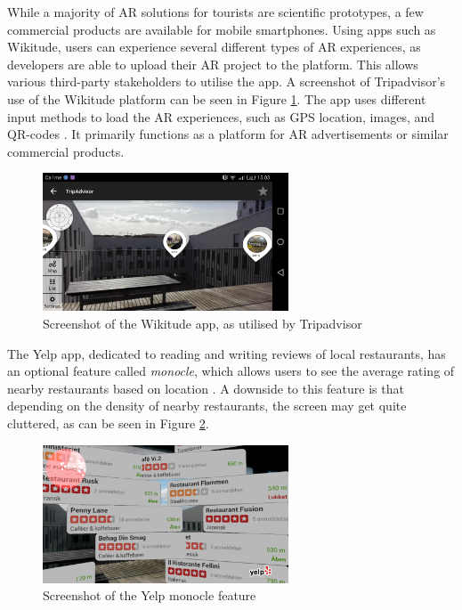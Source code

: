 While a majority of AR solutions for tourists are scientific prototypes, a few commercial products are available for mobile smartphones. Using apps such as Wikitude, users can experience several different types of AR experiences, as developers are able to upload their AR project to the platform. This allows various third-party stakeholders to utilise the app. A screenshot of Tripadvisor's use of the Wikitude platform can be seen in Figure \ref{fig:wikitude}. The app uses different input methods to load the AR experiences, such as GPS location, images, and QR-codes \cite{Wikitude}. It primarily functions as a platform for AR advertisements or similar commercial products.

\begin{figure}[h!]
    \centering
    \includegraphics[width=0.65\textwidth]{figures/wikitude.png}
    \caption{Screenshot of the Wikitude app, as utilised by Tripadvisor}\label{fig:wikitude}
\end{figure}

The Yelp app, dedicated to reading and writing reviews of local restaurants, has an optional feature called \textit{monocle}, which allows users to see the average rating of nearby restaurants based on location \cite{Yelp}. A downside to this feature is that depending on the density of nearby restaurants, the screen may get quite cluttered, as can be seen in Figure \ref{fig:yelp}.

\begin{figure}[h!]
    \centering
    \includegraphics[width=0.65\textwidth]{figures/yelp.png}
    \caption{Screenshot of the Yelp monocle feature}\label{fig:yelp}
\end{figure}


